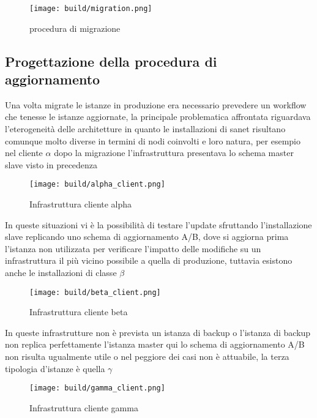 \begin{figure}[H]
    \centering
    \texttt{[image: build/migration.png]}
    \caption{procedura di migrazione}
    \label{fig:migration}
\end{figure}

\subsection{Progettazione della procedura di aggiornamento}
Una volta migrate le istanze in produzione era necessario prevedere un workflow che tenesse le istanze aggiornate, la principale problematica affrontata riguardava l'eterogeneità delle architetture in quanto le installazioni di sanet risultano comunque molto diverse in termini di nodi coinvolti e loro natura, per esempio nel cliente \(\alpha\) dopo la migrazione l'infrastruttura presentava lo schema master slave visto in precedenza

\begin{figure}[H]
    \centering
    \texttt{[image: build/alpha\_client.png]}
    \caption{Infrastruttura cliente alpha}
    \label{fig:alpha_client}
\end{figure}

In queste situazioni vi è la possibilità di testare l'update sfruttando l'installazione slave replicando uno schema di aggiornamento A/B, dove si aggiorna prima l'istanza non utilizzata per verificare l'impatto delle modifiche su un infrastruttura il più vicino possibile a quella di produzione, tuttavia esistono anche le installazioni di classe \(\beta\)

\begin{figure}[H]
    \centering
    \texttt{[image: build/beta\_client.png]}
    \caption{Infrastruttura cliente beta}
    \label{fig:beta_client}
\end{figure}

In queste infrastrutture non è prevista un istanza di backup o l'istanza di backup non replica perfettamente l'istanza master qui lo schema di aggiornamento A/B non risulta ugualmente utile o nel peggiore dei casi non è attuabile, la terza tipologia d'istanze è quella \(\gamma\)

\begin{figure}[H]
    \centering
    \texttt{[image: build/gamma\_client.png]}
    \caption{Infrastruttura cliente gamma}
    \label{fig:gamma_client}
\end{figure}

